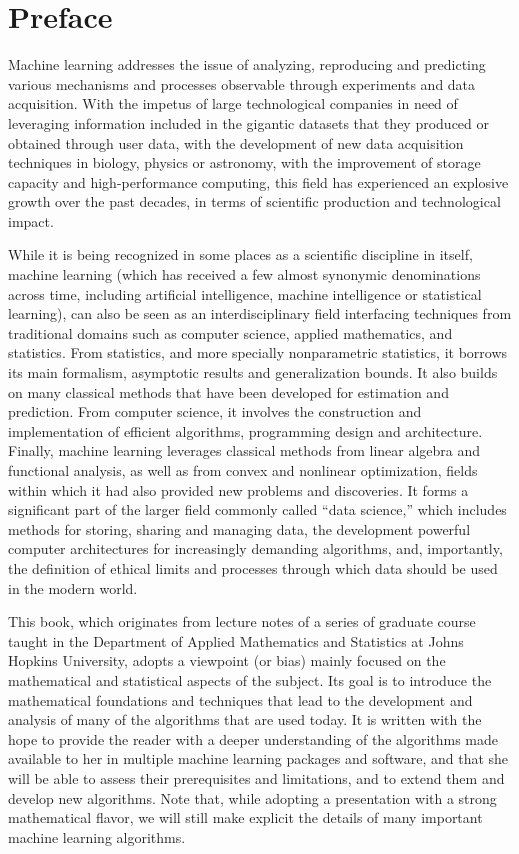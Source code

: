 \chapter*{Preface}

Machine learning addresses the issue of analyzing, reproducing and predicting various mechanisms and processes observable through experiments and data acquisition. With the impetus of large technological companies in need of leveraging information included in the gigantic datasets that they produced or obtained through user data, with the development of new data acquisition techniques in biology, physics or astronomy, with the improvement of storage capacity and high-performance computing, this field has experienced an explosive growth over the past decades, in terms of scientific production and technological impact.



While it is being recognized in some places as a scientific discipline in itself, machine learning (which has received a few almost synonymic denominations across time, including artificial intelligence, machine intelligence or statistical learning), can also be seen as an interdisciplinary field interfacing techniques from traditional domains such as computer science, applied mathematics, and statistics. From statistics, and more specially nonparametric statistics, it borrows its main formalism, asymptotic results and generalization bounds. It also builds on many classical methods that have been developed for estimation and prediction. From computer science, it involves the construction and implementation of efficient algorithms, programming design and architecture. Finally, machine learning leverages classical methods from linear algebra and functional analysis, as well as from convex and nonlinear optimization, fields within which it had also provided new problems and discoveries. It forms a significant part of the larger field commonly called ``data science,'' which includes methods for storing, sharing and managing data, the development powerful computer architectures for increasingly demanding algorithms, and, importantly, the definition of ethical limits and processes through which data should be used in the modern world.
 
 
This book, which originates from lecture notes of a series of graduate course taught in the Department of Applied Mathematics and Statistics at Johns Hopkins University, adopts a  viewpoint (or bias) mainly focused on the mathematical and statistical aspects of the subject. Its goal is to introduce the mathematical foundations and techniques that lead to the development and analysis of many of the algorithms that are used today. It is written with the hope to provide the reader with a deeper understanding of the algorithms made available to her in multiple machine learning packages and software, and that she will be able to assess their prerequisites and limitations, and to extend them and develop new algorithms. Note that, while adopting a presentation with a strong mathematical flavor, we will still make explicit the details of many important machine learning algorithms.

